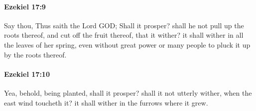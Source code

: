 		\paragraph{Ezekiel 17:9} %
			\label{EZEKIEL-17-9}

			Say thou, Thus saith the Lord GOD; Shall it prosper? shall he not pull up the roots thereof, and cut off the fruit thereof, that it wither? it shall wither in all the leaves of her spring, even without great power or many people to pluck it up by the roots thereof.


		\paragraph{Ezekiel 17:10} %
			\label{EZEKIEL-17-10}

			Yea, behold, being planted, shall it prosper? shall it not utterly wither, when the east wind toucheth it? it shall wither in the furrows where it grew.

